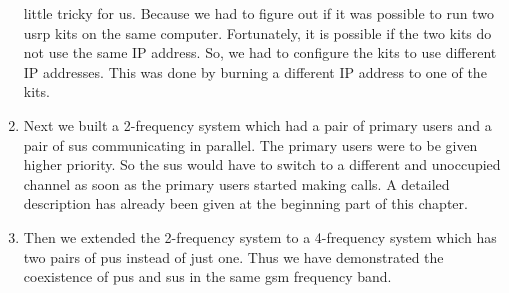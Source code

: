\begin{enumerate}
    little tricky for us. Because we had to figure out if it was possible to
    run two \gls{usrp} kits on the same computer. Fortunately, it is possible if the
    two kits do not use the same IP address. So, we had to configure the kits
    to use different IP addresses. This was done by burning a different IP 
    address to one of the kits.
    \item Next we built a 2-frequency system which had a pair of primary 
    users and a pair of \glspl{su} communicating in parallel. The primary
    users were to be given higher priority. So the \glspl{su} would have
    to switch to a different and unoccupied channel as soon as the primary 
    users started making calls. A detailed description has already been given
    at the beginning part of this chapter.
    \item Then we extended the 2-frequency system to a 4-frequency system
    which has two pairs of \glspl{pu} instead of just one. Thus we have 
    demonstrated the coexistence of \glspl{pu} and \glspl{su} in the 
    same \gls{gsm} frequency band.
\end{enumerate}



